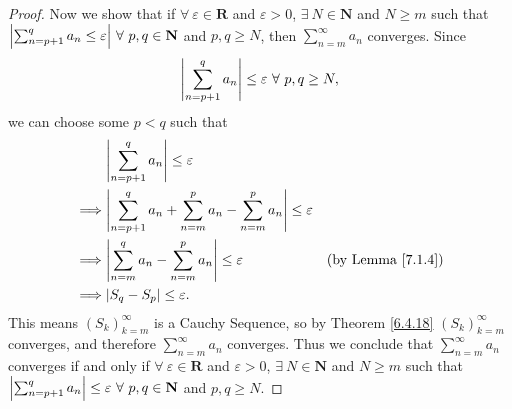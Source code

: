 \begin{proof}
Now we show that if \(\forall\ \varepsilon \in \mathbf{R}\) and \(\varepsilon > 0\), \(\exists\ N \in \mathbf{N}\) and \(N \geq m\) such that \(\abs*{\sum_{n = p + 1}^q a_n \leq \varepsilon} \ \forall\ p, q \in \mathbf{N}\) and \(p, q \geq N\), then \(\sum_{n = m}^\infty a_n\) converges.
Since
\[
    \abs*{\sum_{n = p + 1}^q a_n} \leq \varepsilon \ \forall\ p, q \geq N,
\]
we can choose some \(p < q\) such that
\begin{align*}
& \abs*{\sum_{n = p + 1}^q a_n} \leq \varepsilon \\
\implies & \abs*{\sum_{n = p + 1}^q a_n + \sum_{n = m}^p a_n - \sum_{n = m}^p a_n} \leq \varepsilon \\
\implies & \abs*{\sum_{n = m}^q a_n - \sum_{n = m}^p a_n} \leq \varepsilon & \text{(by Lemma \ref{7.1.4})} \\
\implies & \abs*{S_q - S_p} \leq \varepsilon.
\end{align*}
This means \((S_k)_{k = m}^\infty\) is a Cauchy Sequence, so by Theorem \ref{6.4.18} \((S_k)_{k = m}^\infty\) converges, and therefore \(\sum_{n = m}^\infty a_n\) converges.
Thus we conclude that \(\sum_{n = m}^\infty a_n\) converges if and only if \(\forall\ \varepsilon \in \mathbf{R}\) and \(\varepsilon > 0\), \(\exists\ N \in \mathbf{N}\) and \(N \geq m\) such that \(\abs*{\sum_{n = p + 1}^q a_n} \leq \varepsilon \ \forall\ p, q \in \mathbf{N}\) and \(p, q \geq N\).
\end{proof}
